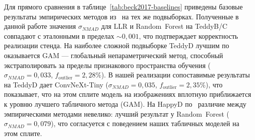 \documentclass[12pt,a4paper]{article}
\begin{document}
Для прямого сравнения в таблице~\ref{tab:beck2017-baselines} приведены базовые результаты эмпирических методов из~\cite{beck2017} на тех же подвыборках. Полученные в данной работе значения $\sigma_{NMAD}$ для LLR и Random~Forest на TeddyB/C совпадают с эталонными в пределах $\sim 0{,}001$, что подтверждает корректность реализации стенда. На наиболее сложной подвыборке TeddyD лучшим по~\cite{beck2017} оказывается GAM — глобальный непараметрический метод, способный экстраполировать за пределы признакового пространства обучения ($\sigma_{NMAD}=0{,}033$, $f_\mathrm{outlier}=2{,}28\%$). В нашей реализации сопоставимые результаты на TeddyD дает ConvNeXt-Tiny ($\sigma_{NMAD}=0{,}035$, $f_\mathrm{outlier}=2{,}35\%$), что показывает, что на этом сплите модель на изображениях вплотную приближается к уровню лучшего табличного метода (GAM). На HappyD по~\cite{beck2017} различие между эмпирическими методами невелико: лучший результат у Random~Forest ($\sigma_{NMAD}=0{,}079$), что согласуется с поведением наших табличных моделей на этом сплите.
\end{document}
